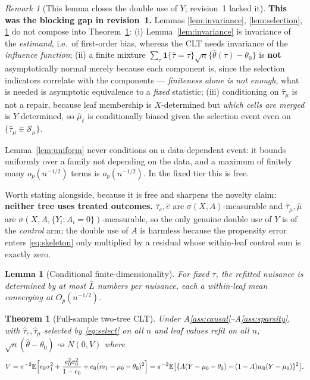 \documentclass[11pt]{article}
\theoremstyle{plain}
\newtheorem{theorem}{Theorem}
\newtheorem{lemma}{Lemma}
\theoremstyle{definition}
\theoremstyle{remark}
\newtheorem{remark}{Remark}
\newcommand{\E}{\mathbb{E}}
\newcommand{\cS}{\mathcal{S}}
\newcommand{\ez}{e_0}
\newcommand{\mz}{\mu_0}
\newcommand{\wz}{w_0}
\newcommand{\ehat}{\widehat{e}}
\newcommand{\mhat}{\widehat{\mu}}
\newcommand{\that}{\widehat{\tau}}
\newcommand{\thetahat}{\widehat{\theta}}
\begin{document}
\begin{remark}[This lemma closes the double use of $Y$; revision~1 lacked it]
\label{rem:uniform-why}
\textbf{This was the blocking gap in revision~1.} Lemmas
\ref{lem:invariance}, \ref{lem:selection}, \ref{lem:findim} do not compose into
Theorem~\ref{thm:main}: (i) Lemma~\ref{lem:invariance} is invariance of the
\emph{estimand}, i.e.\ of first-order bias, whereas the CLT needs invariance of
the \emph{influence function}; (ii) a finite mixture
$\sum_\tau\mathbf1\{\that=\tau\}\sqrt n\{\thetahat(\tau)-\theta_0\}$ is
\textbf{not} asymptotically normal merely because each component is, since the
selection indicators correlate with the components --- \emph{finiteness alone is
not enough}, what is needed is asymptotic equivalence to a \emph{fixed}
statistic; (iii) conditioning on $\that_\mu$ is not a repair, because leaf
membership is $X$-determined but \emph{which cells are merged} is $Y$-determined,
so $\mhat_\ell$ is conditionally biased given the selection event even on
$\{\that_\mu\in\cS_\mu\}$.

Lemma~\ref{lem:uniform} never conditions on a data-dependent event: it bounds
uniformly over a family not depending on the data, and a maximum of finitely many
$o_p(n^{-1/2})$ terms is $o_p(n^{-1/2})$. In the fixed tier this is free.

Worth stating alongside, because it is free and sharpens the novelty claim:
\textbf{neither tree uses treated outcomes.} $\that_e,\ehat$ are
$\sigma(X,A)$-measurable and $\that_\mu,\mhat$ are
$\sigma(X,A,\{Y_i:A_i=0\})$-measurable, so the only genuine double use of $Y$ is
of the \emph{control} arm; the double use of $A$ is harmless because the
propensity error enters \eqref{eq:skeleton} only multiplied by a residual whose
within-leaf control sum is exactly zero.
\end{remark}

\begin{lemma}[Conditional finite-dimensionality]\label{lem:findim}
For fixed $\tau$, the refitted nuisance is determined by at most $\bar L$ numbers
per nuisance, each a within-leaf mean converging at $O_p(n^{-1/2})$.
\end{lemma}

\begin{theorem}[Full-sample two-tree CLT]\label{thm:main}
Under A\ref{ass:causal}--A\ref{ass:sparsity}, with $\that_e,\that_\mu$ selected by
\eqref{eq:select} on all $n$ and leaf values refit on all $n$,
$\sqrt n(\thetahat-\theta_0)\rightsquigarrow N(0,V)$ where
\begin{equation}\label{eq:vdecomp}
  V=\pi^{-2}\E\Bigl[\ez\sigma_1^2+\frac{\ez^2\sigma_0^2}{1-\ez}
   +\ez(m_1-\mz-\theta_0)^2\Bigr]
  =\pi^{-2}\E\bigl[\{A(Y-\mz-\theta_0)-(1-A)\wz(Y-\mz)\}^2\bigr].
\end{equation}
\end{theorem}
\end{document}
